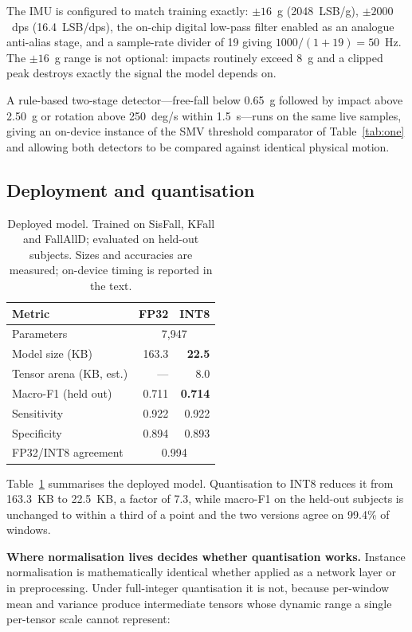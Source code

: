 \documentclass[conference]{IEEEtran}
\begin{document}
The IMU is configured to match training exactly: $\pm16$~g (2048~LSB/g), $\pm2000$~dps
(16.4~LSB/dps), the on-chip digital low-pass filter enabled as an analogue anti-alias
stage, and a sample-rate divider of 19 giving $1000/(1{+}19)=50$~Hz. The $\pm16$~g
range is not optional: impacts routinely exceed 8~g and a clipped peak destroys exactly
the signal the model depends on.

A rule-based two-stage detector---free-fall below 0.65~g followed by impact above
2.50~g or rotation above 250~deg/s within 1.5~s---runs on the same live samples,
giving an on-device instance of the SMV threshold comparator of Table~\ref{tab:one}
and allowing both detectors to be compared against identical physical motion.

\subsection{Deployment and quantisation}
\label{sec:c3}

\begin{table}[t]
\caption{Deployed model. Trained on SisFall, KFall and FallAllD; evaluated on
held-out subjects. Sizes and accuracies are measured; on-device timing is reported
in the text.}
\label{tab:four}
\centering\small
\begin{tabular}{lrr}
\toprule
Metric & FP32 & INT8 \\
\midrule
Parameters                & \multicolumn{2}{c}{7{,}947} \\
Model size (KB)           & 163.3 & \textbf{22.5} \\
Tensor arena (KB, est.)   & ---   & 8.0 \\
Macro-F1 (held out)       & 0.711 & \textbf{0.714} \\
Sensitivity               & 0.922 & 0.922 \\
Specificity               & 0.894 & 0.893 \\
FP32/INT8 agreement       & \multicolumn{2}{c}{0.994} \\
\bottomrule
\end{tabular}
\end{table}

Table~\ref{tab:four} summarises the deployed model. Quantisation to INT8 reduces it
from 163.3~KB to 22.5~KB, a factor of 7.3, while macro-F1 on the held-out subjects is
unchanged to within a third of a point and the two versions agree on 99.4\% of
windows.

\textbf{Where normalisation lives decides whether quantisation works.} Instance
normalisation is mathematically identical whether applied as a network layer or in
preprocessing. Under full-integer quantisation it is not, because per-window mean and
variance produce intermediate tensors whose dynamic range a single per-tensor scale
cannot represent:
\end{document}
